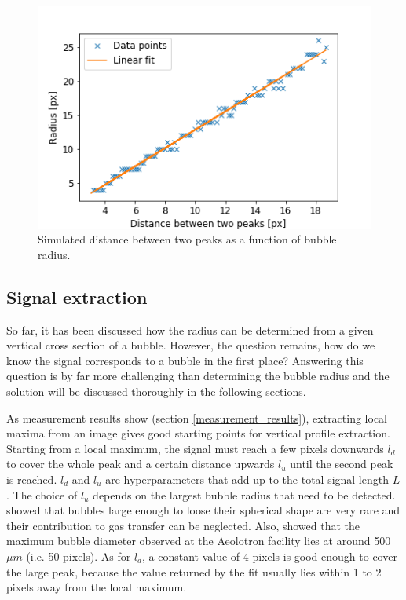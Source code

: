 		\begin{figure}
			\centering
			\includegraphics[scale=.6]{graphs/peak_distance_radius_fit.png}
			\caption{Simulated distance between two peaks as a function of bubble radius.}
			\label{fig:peaks_radius_fit}
		\end{figure}
	
	
	
	\subsection{Signal extraction}
		So far, it has been discussed how the radius can be determined from a given vertical cross section of a bubble. However, the question remains, how do we know the signal corresponds to a bubble in the first place? Answering this question is by far more challenging than determining the bubble radius and the solution will be discussed thoroughly in the following sections. 
		
		As measurement results show (section \ref{measurement_results}), extracting local maxima from an image gives good starting points for vertical profile extraction. Starting from a local maximum, the signal must reach a few pixels downwards $l_{d}$ to cover the whole peak and a certain distance upwards $l_u$ until the second peak is reached. $l_d$ and $l_u$ are hyperparameters that add up to the total signal length $L$. The choice of $l_u$ depends on the largest bubble radius that need to be detected. \citet{Al-Lashi2016} showed that bubbles large enough to loose their spherical shape are very rare and their contribution to gas transfer can be neglected. Also, \citet{Leonie} showed that the maximum bubble diameter observed at the Aeolotron facility lies at around 500 $\mu m$ (i.e. 50 pixels). As for $l_d$, a constant value of 4 pixels is good enough to cover the large peak, because the value returned by the fit usually lies within 1 to 2 pixels away from the local maximum. 	
	
